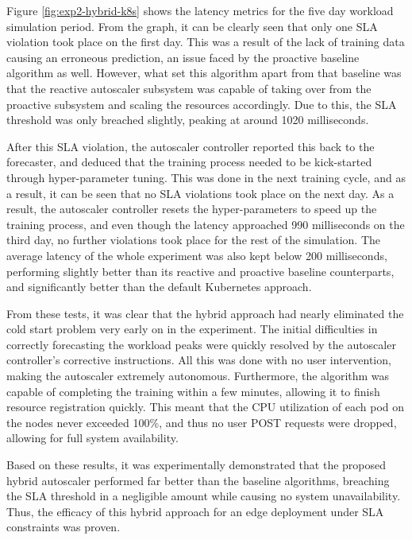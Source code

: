 Figure \ref{fig:exp2-hybrid-k8s} shows the latency metrics for the five day workload simulation period. From the graph, it can be clearly seen that only one SLA violation took place on the first day. This was a result of the lack of training data causing an erroneous prediction, an issue faced by the proactive baseline algorithm as well. However, what set this algorithm apart from that baseline was that the reactive autoscaler subsystem was capable of taking over from the proactive subsystem and scaling the resources accordingly. Due to this, the SLA threshold was only breached slightly, peaking at around 1020 milliseconds.\par
After this SLA violation, the autoscaler controller reported this back to the forecaster, and deduced that the training process needed to be kick-started through hyper-parameter tuning. This was done in the next training cycle, and as a result, it can be seen that no SLA violations took place on the next day. As a result, the autoscaler controller resets the hyper-parameters to speed up the training process, and even though the latency approached 990 milliseconds on the third day, no further violations took place for the rest of the simulation. The average latency of the whole experiment was also kept below 200 milliseconds, performing slightly better than its reactive and proactive baseline counterparts, and significantly better than the default Kubernetes approach.\par

From these tests, it was clear that the hybrid approach had nearly eliminated the cold start problem very early on in the experiment. The initial difficulties in correctly forecasting the workload peaks were quickly resolved by the autoscaler controller's corrective instructions. All this was done with no user intervention, making the autoscaler extremely autonomous. Furthermore, the algorithm was capable of completing the training within a few minutes, allowing it to finish resource registration quickly. This meant that the CPU utilization of each pod on the nodes never exceeded 100\%, and thus no user POST requests were dropped, allowing for full system availability.\par

Based on these results, it was experimentally demonstrated that the proposed hybrid autoscaler performed far better than the baseline algorithms, breaching the SLA threshold in a negligible amount while causing no system unavailability. Thus, the efficacy of this hybrid approach for an edge deployment under SLA constraints was proven.

